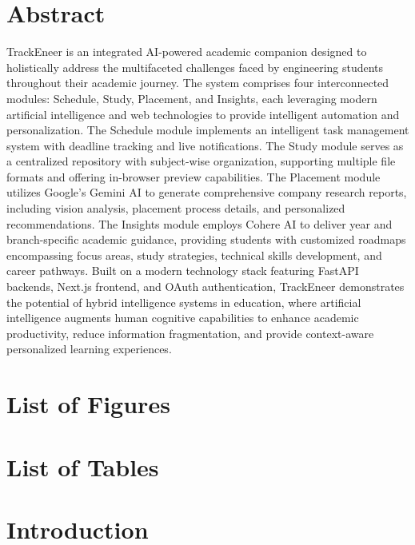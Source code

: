 \documentclass[12pt]{article}
\begin{document}
\section*{Abstract}
TrackEneer is an integrated AI-powered academic companion designed to holistically address the multifaceted challenges faced by engineering students throughout their academic journey. The system comprises four interconnected modules: Schedule, Study, Placement, and Insights, each leveraging modern artificial intelligence and web technologies to provide intelligent automation and personalization. The Schedule module implements an intelligent task management system with deadline tracking and live notifications. The Study module serves as a centralized repository with subject-wise organization, supporting multiple file formats and offering in-browser preview capabilities. The Placement module utilizes Google's Gemini AI to generate comprehensive company research reports, including vision analysis, placement process details, and personalized recommendations. The Insights module employs Cohere AI to deliver year and branch-specific academic guidance, providing students with customized roadmaps encompassing focus areas, study strategies, technical skills development, and career pathways. Built on a modern technology stack featuring FastAPI backends, Next.js frontend, and OAuth authentication, TrackEneer demonstrates the potential of hybrid intelligence systems in education, where artificial intelligence augments human cognitive capabilities to enhance academic productivity, reduce information fragmentation, and provide context-aware personalized learning experiences.

\newpage
\section*{List of Figures}
\listoffigures

\newpage
\section*{List of Tables}
\listoftables

\newpage
{}
\setcounter{page}{1}

\section{Introduction}
\end{document}

